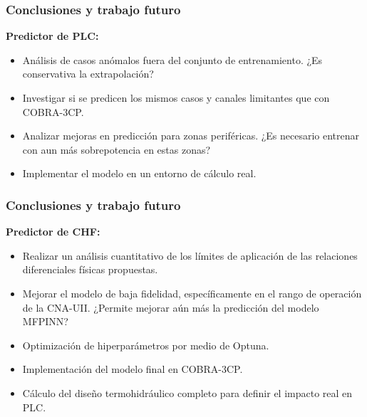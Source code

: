 \documentclass{beamer}
\begin{document}
\begin{frame}
    \frametitle{Conclusiones y trabajo futuro}
    \textbf{Predictor de PLC:}
    \begin{itemize}[label={\square}]
        \item Análisis de casos anómalos fuera del conjunto de entrenamiento. ¿Es conservativa la extrapolación?
        \item Investigar si se predicen los mismos casos y canales limitantes que con COBRA-3CP.
        \item Analizar mejoras en predicción para zonas periféricas. ¿Es necesario entrenar con aun más sobrepotencia en estas zonas?
        \item Implementar el modelo en un entorno de cálculo real.
    \end{itemize}
\end{frame}

\begin{frame}
    \frametitle{Conclusiones y trabajo futuro}

    \textbf{Predictor de CHF:}
    \begin{itemize}[label={\square}]
        \item Realizar un análisis cuantitativo de los límites de aplicación de las relaciones diferenciales físicas propuestas.
        \item Mejorar el modelo de baja fidelidad, específicamente en el rango de operación de la CNA-UII. ¿Permite mejorar aún más la predicción del modelo MFPINN?
        \item Optimización de hiperparámetros por medio de Optuna.
        \item Implementación del modelo final en COBRA-3CP.
        \item Cálculo del diseño termohidráulico completo para definir el impacto real en PLC.
    \end{itemize}
\end{frame}
\end{document}
